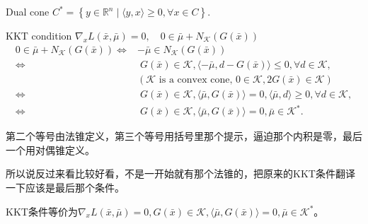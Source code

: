 Dual cone $C^{*}=\left\{y \in \mathbb{R}^{n} \mid\langle y, x\rangle \geq 0, \forall x \in C\right\} .$

KKT condition $\nabla_{x} L(\bar{x}, \bar{\mu})=0, \quad 0 \in \bar{\mu}+N_{\mathcal{K}}(G(\bar{x}))$
\[
  \begin{aligned}
    0 \in \bar{\mu}+N_{\mathcal{K}}(G(\bar{x})) \Longleftrightarrow & -\bar{\mu} \in N_{\mathcal{K}}(G(\bar{x})) \\
    \Longleftrightarrow &\; G(\bar{x}) \in \mathcal{K},\langle-\bar{\mu}, d-G(\bar{x})\rangle \leq 0, \forall d \in \mathcal{K}, \\
    & (\mathcal{K} \text { is a convex cone, } 0 \in \mathcal{K}, 2 G(\bar{x}) \in \mathcal{K}) \\
    \Longleftrightarrow &\; G(\bar{x}) \in \mathcal{K},\langle\bar{\mu}, G(\bar{x})\rangle=0,\langle\bar{\mu}, d\rangle \geq 0, \forall d \in \mathcal{K}, \\
    \Longleftrightarrow &\; G(\bar{x}) \in \mathcal{K},\langle\bar{\mu}, G(\bar{x})\rangle=0, \bar{\mu} \in \mathcal{K}^{*} .
  \end{aligned}
\]

第二个等号由法锥定义，第三个等号用括号里那个提示，逼迫那个内积是零，最后一个用对偶锥定义。

所以说反过来看比较好看，不是一开始就有那个法锥的，把原来的KKT条件翻译一下应该是最后那个条件。

KKT条件等价为$\nabla_{x} L(\bar{x}, \bar{\mu})=0, G(\bar{x}) \in \mathcal{K},\langle\bar{\mu}, G(\bar{x})\rangle=0, \bar{\mu} \in \mathcal{K}^{*}$。

